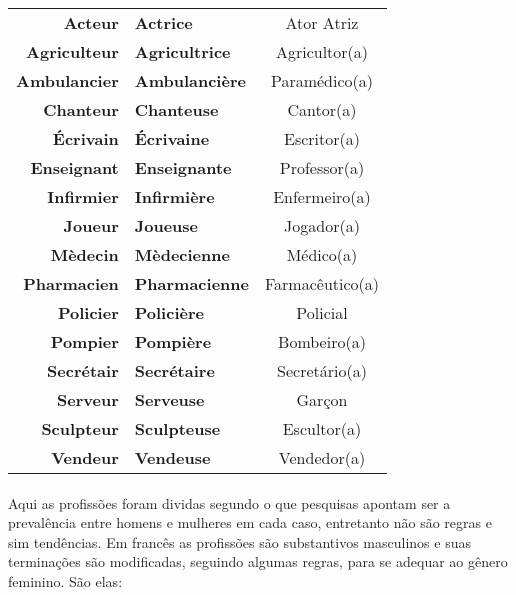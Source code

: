\documentclass{article}
\begin{document}
        \begin{center}
            \begin{tabular}{r l c}
                \textbf{Acteur}      & \textbf{Actrice}      & Ator Atriz\\
                \textbf{Agriculteur} & \textbf{Agricultrice} & Agricultor(a)\\
                \textbf{Ambulancier} & \textbf{Ambulancière} & Paramédico(a)\\
                \textbf{Chanteur}    & \textbf{Chanteuse}    & Cantor(a)\\
                \textbf{Écrivain}    & \textbf{Écrivaine}    & Escritor(a)\\
                \textbf{Enseignant}  & \textbf{Enseignante}  & Professor(a)\\
                \textbf{Infirmier}   & \textbf{Infirmière}   & Enfermeiro(a)\\
                \textbf{Joueur}      & \textbf{Joueuse}      & Jogador(a)\\
                \textbf{Mèdecin}     & \textbf{Mèdecienne}   & Médico(a)\\
                \textbf{Pharmacien}  & \textbf{Pharmacienne} & Farmacêutico(a)\\
                \textbf{Policier}    & \textbf{Policière}    & Policial\\
                \textbf{Pompier}     & \textbf{Pompière}     & Bombeiro(a)\\
                \textbf{Secrétair}   & \textbf{Secrétaire}   & Secretário(a)\\
                \textbf{Serveur}     & \textbf{Serveuse}     & Garçon\\
                \textbf{Sculpteur}   & \textbf{Sculpteuse}   & Escultor(a)\\
                \textbf{Vendeur}     & \textbf{Vendeuse}     & Vendedor(a)\\
            \end{tabular}
        \end{center}    

    \paragraph{}Aqui as profissões foram dividas segundo o que pesquisas apontam ser a prevalência entre homens e mulheres em cada caso, entretanto não são regras e sim tendências. Em francês as profissões são substantivos masculinos e suas terminações são modificadas, seguindo algumas regras, para se adequar ao gênero feminino. São elas:
        
\end{document}

